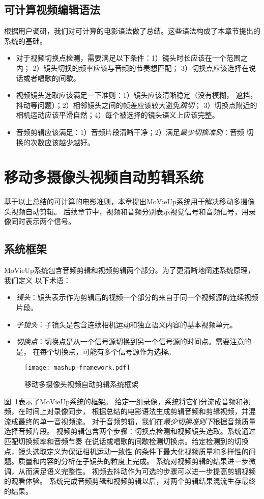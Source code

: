 \subsection{可计算视频编辑语法}
根据用户调研，我们对可计算的电影语法做了总结。这些语法构成了本章节提出的系统的基础。
\begin{itemize}
    \item 对于视频切换点检测，需要满足以下条件：1）镜头时长应该在一个范围之内；
        2）镜头切换的频率应该与音频的节奏想匹配；
        3）切换点应该选择在说话或者唱歌的间歇。
    \item 视频镜头选取应该满足一下准则：1）镜头应该清晰稳定（没有模糊，
        遮挡，抖动等问题）；2）相邻镜头之间的帧差应该较大避免\emph{跳切}；
        3）切换点附近的相机运动应该平滑自然；4）每个被选择的镜头语义上应该完整。
    \item 音频剪辑应该满足：1）音频片段清晰干净；2）满足\emph{最少切换准则}：音频
        切换的次数应该越少越好。
\end{itemize}

\section{移动多摄像头视频自动剪辑系统}
基于以上总结的可计算的电影准则，本章提出MoVieUp系统用于解决移动多摄像头视频自动剪辑。
后续章节中，视频和音频分别表示视觉信号和音频信号，用录像同时表示两个信号。

\subsection{系统框架}
MoVieUp系统包含音频剪辑和视频剪辑两个部分。为了更清晰地阐述系统原理，我们定义
以下术语：
\begin{itemize}
    \item \emph{镜头}：镜头表示作为剪辑后的视频一个部分的来自于同一个视频源的连续视频片段。
    \item \emph{子镜头}：子镜头是包含连续相机运动和独立语义内容的基本视频单元。
    \item \emph{切换点}：切换点是从一个信号源切换到另一个信号源的时间点。需要注意的是，
        在每个切换点，可能有多个信号源作为选择。
\end{itemize}

\begin{figure}[ht]
    \centering
    \texttt{[image: mashup-framework.pdf]}
    \caption{移动多摄像头视频自动剪辑系统框架}
    \label{fig:mashup-framework}
\end{figure}
图~\ref{fig:mashup-framework}表示了MoVieUp系统的框架。
给定一组录像，系统将它们分流成音频和视频，在时间上对录像同步，
根据总结的电影语法生成剪辑音频和剪辑视频，并混流成最终的单一音视频流。
对于音频剪辑，我们在\emph{最少切换准则下}根据音频质量选择音频片段。
视频剪辑包含两个步骤：切换点检测和视频镜头选取。系统通过匹配切换频率和音频节奏
在说话或唱歌的间歇检测切换点。给定检测到的切换点，镜头选取定义为保证相机运动一致性
的条件下最大化视频质量和多样性的问题。质量和内容的分析在子镜头的粒度上完成。
系统对视频剪辑的结果进一步微调，从而满足语义完整性。
视频去抖动作为可选的步骤可以进一步提高剪辑视频的观看体验。
系统完成音频剪辑和视频剪辑以后，对两个剪辑结果混流生存最终的结果。

